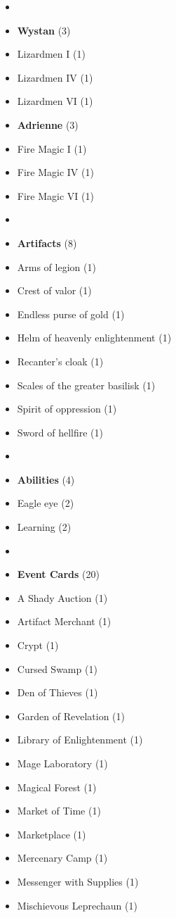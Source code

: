 \begin{multicols*}{3}
\begin{itemize}[leftmargin=0pt, label={}, noitemsep, noitemsep]
  \item
  \item \textbf{Wystan} (3)
  \item Lizardmen I (1)
  \item Lizardmen IV (1)
  \item Lizardmen VI (1)
  \item \textbf{Adrienne} (3)
  \item Fire Magic I (1)
  \item Fire Magic IV (1)
  \item Fire Magic VI (1)
  \item
  \item \textbf{Artifacts} (8)
  \item Arms of legion (1)
  \item Crest of valor (1)
  \item Endless purse of gold (1)
  \item Helm of heavenly enlightenment (1)
  \item Recanter's cloak (1)
  \item Scales of the greater basilisk (1)
  \item Spirit of oppression (1)
  \item Sword of hellfire (1)
  \item
  \item \textbf{Abilities} (4)
  \item Eagle eye (2)
  \item Learning (2)
  \item
  \item \textbf{Event Cards} (20)
  \item A Shady Auction (1)
  \item Artifact Merchant (1)
  \item Crypt (1)
  \item Cursed Swamp (1)
  \item Den of Thieves (1)
  \item Garden of Revelation (1)
  \item Library of Enlightenment (1)
  \item Mage Laboratory (1)
  \item Magical Forest (1)
  \item Market of Time (1)
  \item Marketplace (1)
  \item Mercenary Camp (1)
  \item Messenger with Supplies (1)
  \item Mischievous Leprechaun (1)

\end{itemize}
\end{multicols*}
